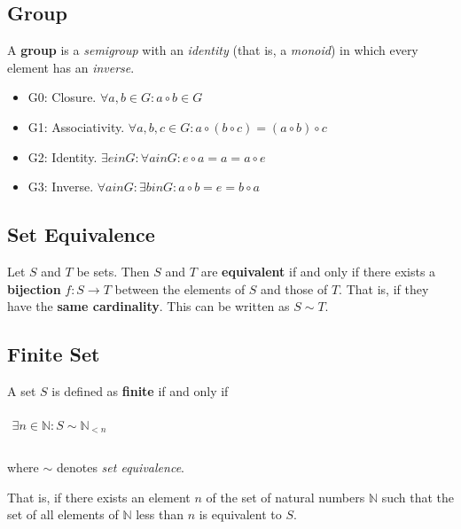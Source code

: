 \subsection{Group}
\label{sec:group}

A \textbf{group} is a \textit{semigroup} with an \textit{identity}
(that is, a \textit{monoid}) in which every element has an
\textit{inverse}.

\begin{itemize}
\item G0: Closure. $ \forall a, b \in G: a \circ b \in G$
\item G1: Associativity. $ \forall a, b, c \in G: a \circ (b \circ c) = (a \circ b) \circ c $
\item G2: Identity. $\exists e in G : \forall a in G: e \circ a = a = a \circ e $
\item G3: Inverse. $\forall a in G: \exists b in G: a \circ b = e = b \circ a$
\end{itemize}


\subsection{Set Equivalence}
\label{sec:set-eq}

Let $S$ and $T$ be sets. Then $S$ and $T$ are \textbf{equivalent} if
and only if there exists a \textbf{bijection} $f : S \to T$ between
the elements of $S$ and those of $T$. That is, if they have the
\textbf{same cardinality}. This can be written as $S \sim T$.


\subsection{Finite Set}
\label{sec:finite-set}

A set $S$ is defined as \textbf{finite} if and only if

\begin{math}
  \begin{array}{c}
    \\
    \exists n \in \mathbb{N}: S \sim \mathbb{N}_{< n}\\
    \\
  \end{array}
\end{math}

where $\sim$ denotes \textit{set equivalence}.

That is, if there exists an element $n$ of the set of natural numbers
$\mathbb{N}$ such that the set of all elements of $\mathbb{N}$ less
than $n$ is equivalent to $S$.

